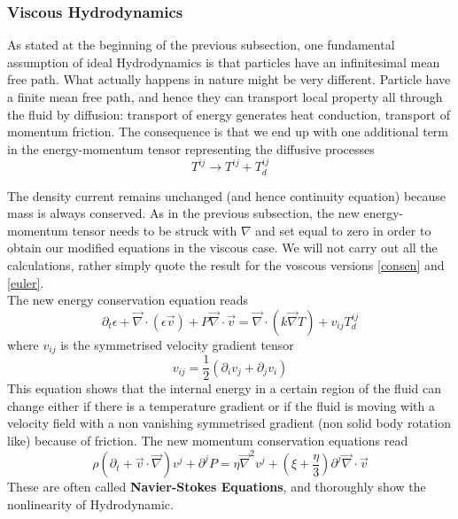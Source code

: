 \documentclass[11pt]{article}
\numberwithin{equation}{section}
\begin{document}
\subsubsection{Viscous Hydrodynamics}

As stated at the beginning of the previous subsection, one fundamental assumption of ideal Hydrodynamics is that particles have an infinitesimal mean free path. What actually happens in nature might be very different. Particle have a finite mean free path, and hence they can transport local property all through the fluid by diffusion: transport of energy generates heat conduction, transport of momentum friction. The consequence is that we end up with one additional term in the energy-momentum tensor representing the diffusive processes
$$
T^{ij} \to T^{ij} + T^{ij}_d 
$$

The density current remains unchanged (and hence continuity equation) because mass is always conserved. As in the previous subsection, the new energy-momentum tensor needs to be struck with $\nabla$ and set equal to zero in order to obtain our modified equations in the viscous case. We will not carry out all the calculations, rather simply quote the result for the voscous versions \ref{consen} and \ref{euler}. \\
The new energy conservation equation reads
$$
\partial_t \epsilon + \vec \nabla \cdot (\epsilon \vec{v}) + P \vec \nabla \cdot \vec{v} = \vec \nabla \cdot (k \vec \nabla T) + v_{ij} T_d^{ij} 
$$
where $v_{ij}$ is the symmetrised velocity gradient tensor
$$
v_{ij} = \frac{1}{2}(\partial_i v_j + \partial_j v_i)
$$
This equation shows that the internal energy in a certain region of the fluid can change either if there is a temperature gradient or if the fluid is moving with a velocity field with a non vanishing symmetrised gradient (non solid body rotation like) because of friction.
The new momentum conservation equations read
$$
\rho \left( \partial_t + \vec{v} \cdot \vec \nabla \right) v^j+\partial^jP = \eta \vec \nabla^2v^j + \left( \xi + \frac{\eta}{3} \right) \partial^j \vec \nabla \cdot \vec{v}
$$
These are often called \textbf{Navier-Stokes Equations}, and thoroughly show the nonlinearity of Hydrodynamic.
\end{document}
